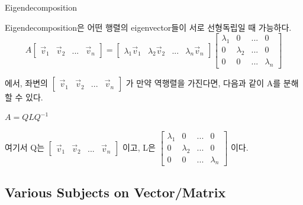 \documentclass{beamer}
\begin{document}
\begin{frame}{Eigendecomposition} 

Eigendecomposition은 어떤 행렬의 eigenvector들이 서로 선형독립일 때 가능하다. 
\begin{equation}
A \left[ \begin{matrix} 
\vec{v}_1 & \vec{v}_2 & ... & \vec{v}_n
\end{matrix} \right] 
= \left[ \begin{matrix} 
\lambda_1 \vec{v}_1 & \lambda_2 \vec{v}_2 & ... & \lambda_n \vec{v}_n
\end{matrix} \right] 
\left[ \begin{matrix} 
\lambda_1 & 0 & ... & 0 \\
0 & \lambda_2 & ... & 0 \\
0 & 0 & ... & \lambda_n \end{matrix} \right]
\end{equation}

에서, 좌변의 $\left[ \begin{matrix} 
\vec{v}_1 & \vec{v}_2 & ... & \vec{v}_n
\end{matrix} \right] $ 가 만약 역행렬을 가진다면, 다음과 같이 A를 분해할 수 있다. 

$ A = QL Q^{-1}$ 

여기서 Q는 $\left[ \begin{matrix} 
\vec{v}_1 & \vec{v}_2 & ... & \vec{v}_n
\end{matrix} \right] $ 이고, L은 $\left[ \begin{matrix} 
\lambda_1 & 0 & ... & 0 \\
0 & \lambda_2 & ... & 0 \\
0 & 0 & ... & \lambda_n \end{matrix} \right]$ 이다. 
\end{frame}

\subsection{Various Subjects on Vector/Matrix} 
\end{document}
